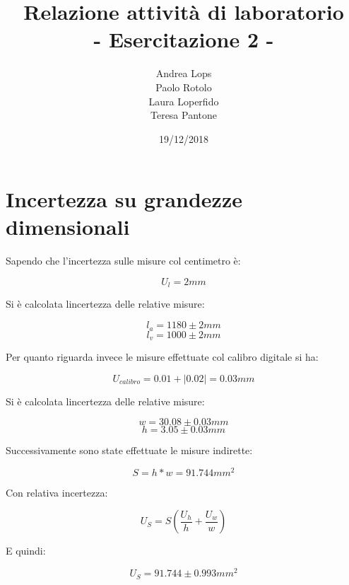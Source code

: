\documentclass[a4paper]{article}
\title{\textbf{Relazione attività di laboratorio}\\{\normalsize - Esercitazione 2 -}}
\author{Andrea Lops\\
		Paolo Rotolo\\
		Laura Loperfido\\
		Teresa Pantone
	   }
\date{19/12/2018}
\begin{document}
\maketitle

\section {Incertezza su grandezze dimensionali}

Sapendo che l'incertezza sulle misure col centimetro è:
\begin{Large} 
	\begin{equation}
		U_{l} = 2mm
	 \end{equation}
\end{Large}
Si è calcolata lincertezza delle relative misure: 
\begin{Large} 
	\begin{equation}
		l_a = 1180\pm2mm
	 \end{equation}
	 \begin{equation}
		l_v = 1000\pm2mm
	 \end{equation}
\end{Large}
Per quanto riguarda invece le misure effettuate col calibro digitale si ha: 
\begin{Large} 
	\begin{equation}
		U_{calibro} = 0.01 + |0.02| = 0.03mm
	 \end{equation}
\end{Large}
Si è calcolata lincertezza delle relative misure: 
\begin{Large} 
	\begin{equation}
		w = 30.08\pm0.03mm
	 \end{equation}
	 \begin{equation}
		h = 3.05\pm0.03mm
	 \end{equation}
\end{Large}
Successivamente sono state effettuate le misure indirette:
\begin{Large} 
	\begin{equation}
		S = h*w = 91.744 mm^2
	 \end{equation}
\end{Large}
Con relativa incertezza:
\begin{Large} 
	\begin{equation}
		U_{S} =S(\frac{U_h}{h}+\frac{U_w}{w})
	 \end{equation}
\end{Large}
E quindi: 
\begin{Large} 
	\begin{equation}
		U_{S} =91.744\pm 0.993mm^2
	 \end{equation}
\end{Large}
\end{document}
